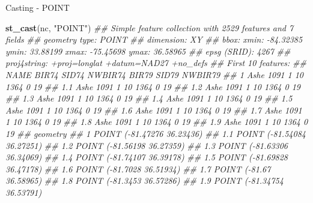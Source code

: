 \documentclass[11pt,ignorenonframetext,]{beamer}
\newenvironment{Shaded}{}{}
\newcommand{\CommentTok}[1]{\textcolor[rgb]{0.38,0.63,0.69}{\textit{#1}}}
\newcommand{\KeywordTok}[1]{\textcolor[rgb]{0.00,0.44,0.13}{\textbf{#1}}}
\newcommand{\NormalTok}[1]{#1}
\newcommand{\StringTok}[1]{\textcolor[rgb]{0.25,0.44,0.63}{#1}}
\let\oldShaded\Shaded
\let\endoldShaded\endShaded
\renewenvironment{Shaded}{\footnotesize\begin{spacing}{0.9}\oldShaded}{\endoldShaded\end{spacing}}
\let\oldverbatim\verbatim
\let\endoldverbatim\endverbatim
\newcommand{\scriptoutput}{
  \renewenvironment{Shaded}{\scriptsize\begin{spacing}{0.9}\oldShaded}{\endoldShaded\end{spacing}}
  \renewenvironment{verbatim}{\scriptsize\begin{spacing}{0.9}\oldverbatim}{\endoldverbatim\end{spacing}}
}
\begin{document}
\begin{frame}[fragile,t]{Casting - POINT}
\protect\hypertarget{casting---point}{}

\scriptoutput

\begin{Shaded}
\begin{Highlighting}[]
\KeywordTok{st_cast}\NormalTok{(nc, }\StringTok{"POINT"}\NormalTok{)}
\CommentTok{## Simple feature collection with 2529 features and 7 fields}
\CommentTok{## geometry type:  POINT}
\CommentTok{## dimension:      XY}
\CommentTok{## bbox:           xmin: -84.32385 ymin: 33.88199 xmax: -75.45698 ymax: 36.58965}
\CommentTok{## epsg (SRID):    4267}
\CommentTok{## proj4string:    +proj=longlat +datum=NAD27 +no_defs}
\CommentTok{## First 10 features:}
\CommentTok{##     NAME BIR74 SID74 NWBIR74 BIR79 SID79 NWBIR79}
\CommentTok{## 1   Ashe  1091     1      10  1364     0      19}
\CommentTok{## 1.1 Ashe  1091     1      10  1364     0      19}
\CommentTok{## 1.2 Ashe  1091     1      10  1364     0      19}
\CommentTok{## 1.3 Ashe  1091     1      10  1364     0      19}
\CommentTok{## 1.4 Ashe  1091     1      10  1364     0      19}
\CommentTok{## 1.5 Ashe  1091     1      10  1364     0      19}
\CommentTok{## 1.6 Ashe  1091     1      10  1364     0      19}
\CommentTok{## 1.7 Ashe  1091     1      10  1364     0      19}
\CommentTok{## 1.8 Ashe  1091     1      10  1364     0      19}
\CommentTok{## 1.9 Ashe  1091     1      10  1364     0      19}
\CommentTok{##                       geometry}
\CommentTok{## 1   POINT (-81.47276 36.23436)}
\CommentTok{## 1.1 POINT (-81.54084 36.27251)}
\CommentTok{## 1.2 POINT (-81.56198 36.27359)}
\CommentTok{## 1.3 POINT (-81.63306 36.34069)}
\CommentTok{## 1.4 POINT (-81.74107 36.39178)}
\CommentTok{## 1.5 POINT (-81.69828 36.47178)}
\CommentTok{## 1.6  POINT (-81.7028 36.51934)}
\CommentTok{## 1.7    POINT (-81.67 36.58965)}
\CommentTok{## 1.8  POINT (-81.3453 36.57286)}
\CommentTok{## 1.9 POINT (-81.34754 36.53791)}
\end{Highlighting}
\end{Shaded}

\end{frame}
\end{document}
